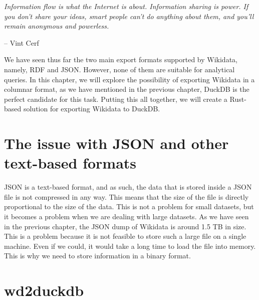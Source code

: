 \epigraph{\textit{Information flow is what the Internet is about. Information sharing is power. If you don't share your ideas, smart people can't do anything about them, and you'll remain anonymous and powerless.}}{-- \textup{Vint Cerf}}

We have seen thus far the two main export formats supported by Wikidata, namely, RDF and JSON. However, none of them are suitable for analytical queries. In this chapter, we will explore the possibility of exporting Wikidata in a columnar format, as we have mentioned in the previous chapter, DuckDB is the perfect candidate for this task. Putting this all together, we will create a Rust-based solution for exporting Wikidata to DuckDB.

\section{The issue with JSON and other text-based formats}

JSON is a text-based format, and as such, the data that is stored inside a JSON file is not compressed in any way. This means that the size of the file is directly proportional to the size of the data. This is not a problem for small datasets, but it becomes a problem when we are dealing with large datasets. As we have seen in the previous chapter, the JSON dump of Wikidata is around 1.5 TB in size. This is a problem because it is not feasible to store such a large file on a single machine. Even if we could, it would take a long time to load the file into memory. This is why we need to store information in a binary format.

\section{wd2duckdb}